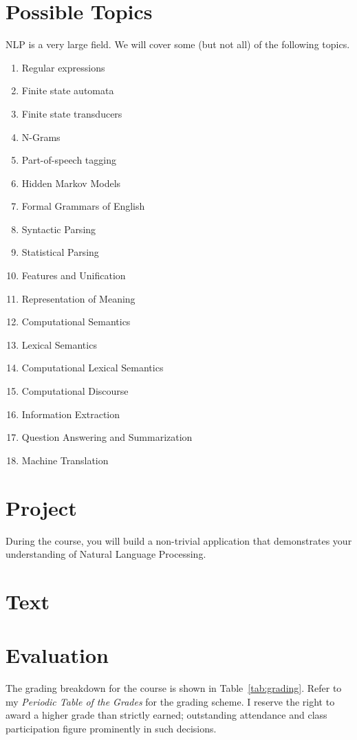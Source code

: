 \documentclass[11pt]{article}
\begin{document}
\section{Possible Topics}
NLP is a very large field. We will cover some (but not all) of the following topics.
\begin{enumerate}
\item Regular expressions
\item Finite state automata
\item Finite state transducers
\item N-Grams
\item Part-of-speech tagging
\item Hidden Markov Models
\item Formal Grammars of English
\item Syntactic Parsing
\item Statistical Parsing
\item Features and Unification
\item Representation of Meaning
\item Computational Semantics
\item Lexical Semantics
\item Computational Lexical Semantics
\item Computational Discourse
\item Information Extraction
\item Question Answering and Summarization
\item Machine Translation
\end{enumerate}

\section{Project}

During the course,
you will build a non-trivial application
that demonstrates your understanding of Natural Language Processing.

\section{Text}



\section{Evaluation}

The grading breakdown for the course
is shown in Table~\ref{tab:grading}.
Refer to my \emph{Periodic Table of the Grades}
for the grading scheme.
I reserve the right to award a higher grade than strictly earned;
outstanding attendance and class participation
figure prominently in such decisions.
\end{document}
